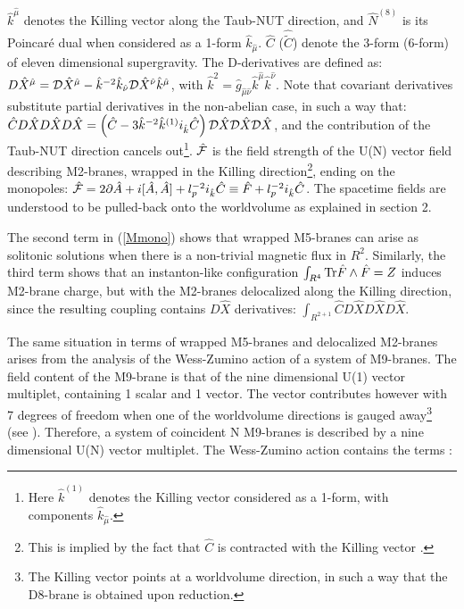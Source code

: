 \documentclass[12pt,a4paper]{article}
\begin{document}
\noindent ${\hat k}^{\hat \mu}$ denotes the Killing vector along the
Taub-NUT direction, and
${\hat N}^{(8)}$ is its Poincar\'e dual when
considered as a 1-form ${\hat k}_{\hat \mu}$.
${\hat C}$ (${\hat {\tilde C}}$) denote the 3-form
(6-form) of eleven dimensional supergravity.  
The D-derivatives are defined as:
$D{\hat X}^{{\hat \mu}}={\cal D}{\hat X}^{{\hat \mu}}-
{\hat k}^{-2}{\hat k}_{{\hat \nu}}{\cal D}{\hat X}^{{\hat \nu}}
{\hat k}^{{\hat \mu}}$, with
${\hat k}^2={\hat g}_{{\hat \mu}{\hat \nu}}
{\hat k}^{\hat \mu}{\hat k}^{\hat \nu}$. Note that covariant
derivatives substitute partial derivatives in the non-abelian case,
in such a way that:  
${\hat C}D{\hat X}D{\hat X}D{\hat X}=
\left({\hat C}-3{\hat k}^{-2}
{\hat k}^{(1)} i_{\hat k}{\hat C}\right)
{\cal D}{\hat X}{\cal D}{\hat X}{\cal D}{\hat X}$, 
and the contribution of the 
Taub-NUT direction cancels out\footnote{Here ${\hat k}^{(1)}$ denotes
the Killing vector considered as a 1-form, with components
${\hat k}_{\hat \mu}$.}. 
${\hat {\cal F}}$ is the
field strength of the U(N) vector field describing 
M2-branes, wrapped in the Killing direction\footnote{This is implied
by the fact that ${\hat C}$ is contracted with the Killing vector
\cite{BEL}.}, ending on the monopoles:
${\hat {\cal F}}=2\partial{\hat A}+i[{\hat A},{\hat A}]+
l_p^{-2}i_{\hat k}{\hat C}
\equiv {\hat F}+l_p^{-2}i_{\hat k}{\hat C}$. The spacetime fields
are understood to be pulled-back onto the worldvolume as explained
in section 2.

The second term in (\ref{Mmono}) shows that wrapped M5-branes can
arise as solitonic solutions when there is a non-trivial magnetic
flux in $R^2$. Similarly, the third term shows that an instanton-like
configuration $\int_{R^4}{\rm Tr}{\hat F}\wedge {\hat F}=Z$ induces
M2-brane charge, but with the M2-branes delocalized along
the Killing direction, since the resulting
coupling contains $D{\hat X}$ derivatives:
$\int_{R^{2+1}}{\hat C}D{\hat X}D{\hat X}D{\hat X}$.
 
The same situation in terms of wrapped M5-branes and delocalized
M2-branes arises from the analysis of the Wess-Zumino action of
a system of M9-branes. The field content of the M9-brane is that
of the nine dimensional U(1) vector multiplet, containing 1 scalar
and 1 vector. The vector contributes however with 7 degrees of
freedom when one of the worldvolume directions is gauged 
away\footnote{The Killing vector points at a worldvolume direction,
in such a way that the D8-brane is obtained upon reduction.}
(see \cite{BvdS}). Therefore, a system of coincident N M9-branes
is described by a nine dimensional U(N) vector multiplet.
The Wess-Zumino action contains the terms \cite{Sato}:
\end{document}
